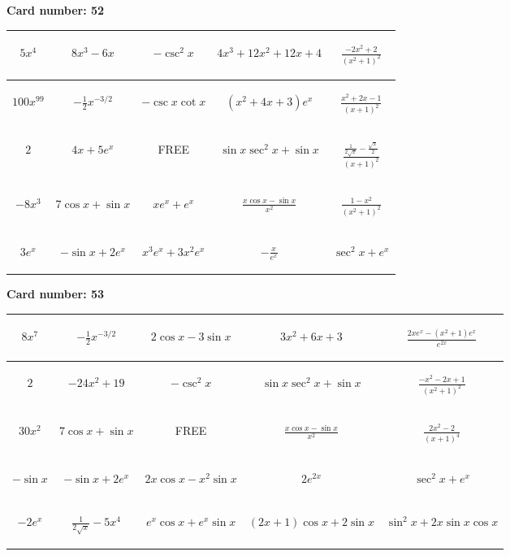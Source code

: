 \documentclass{article}
\newcommand{\entry}[1]{\begin{minipage}[t][2.75cm][t]{4cm} \vspace{1cm} \begin{center}#1\end{center} \end{minipage}}
\newcommand{\freespace}{\entry{FREE}}
\newcommand{\cardnumber}[1]{\noindent \textbf{Card number: #1} \bigskip}
\begin{document}
\pagebreak

\cardnumber{52}
\begin{center}
\begin{tabular}{|*{5}{c|}}
    \hline
    \entry{$5x^4$} & \entry{$8x^3 - 6x$} & \entry{$-\csc^2 x$} & \entry{$4x^3 + 12x^2 + 12x + 4$} & \entry{$\frac{-2x^2 + 2}{(x^2 + 1)^2}$} \\ \hline
    \entry{$100x^{99}$} & \entry{$-\frac{1}{2} x^{-3/2}$} & \entry{$-\csc x \cot x$} & \entry{$(x^2 + 4x + 3) e^x$} & \entry{$\frac{x^2 + 2x - 1}{(x + 1)^2}$} \\ \hline
    \entry{$2$} & \entry{$4x + 5e^x$} & \freespace & \entry{$\sin x \sec^2 x + \sin x$} & \entry{$\frac{\frac{1}{2 \sqrt{x}} - \frac{\sqrt{x}}{2}}{(x + 1)^2}$} \\ \hline
    \entry{$-8x^3$} & \entry{$7 \cos x + \sin x$} & \entry{$x e^x + e^x$} & \entry{$\frac{x \cos x - \sin x}{x^2}$} & \entry{$\frac{1 - x^2}{(x^2 + 1)^2}$} \\ \hline
    \entry{$3e^x$} & \entry{$-\sin x + 2e^x$} & \entry{$x^3 e^x + 3x^2 e^x$} & \entry{$-\frac{x}{e^x}$} & \entry{$\sec^2 x + e^x$} \\ \hline
\end{tabular}
\end{center}

\pagebreak

\cardnumber{53}
\begin{center}
\begin{tabular}{|*{5}{c|}}
    \hline
    \entry{$8x^7$} & \entry{$-\frac{1}{2} x^{-3/2}$} & \entry{$2 \cos x - 3 \sin x$} & \entry{$3x^2 + 6x + 3$} & \entry{$\frac{2x e^x - (x^2 + 1) e^x}{e^{2x}}$} \\ \hline
    \entry{$2$} & \entry{$-24x^2 + 19$} & \entry{$-\csc^2 x$} & \entry{$\sin x \sec^2 x + \sin x$} & \entry{$\frac{-x^2 - 2x + 1}{(x^2 + 1)^2}$} \\ \hline
    \entry{$30x^2$} & \entry{$7 \cos x + \sin x$} & \freespace & \entry{$\frac{x \cos x - \sin x}{x^2}$} & \entry{$\frac{2x^2 - 2}{(x + 1)^4}$} \\ \hline
    \entry{$-\sin x$} & \entry{$-\sin x + 2e^x$} & \entry{$2x \cos x - x^2 \sin x$} & \entry{$2e^{2x}$} & \entry{$\sec^2 x + e^x$} \\ \hline
    \entry{$-2e^x$} & \entry{$\frac{1}{2\sqrt{x}} - 5x^4$} & \entry{$e^x \cos x + e^x \sin x$} & \entry{$(2x + 1) \cos x + 2 \sin x$} & \entry{$\sin^2 x + 2x \sin x \cos x$} \\ \hline
\end{tabular}
\end{center}
\end{document}
